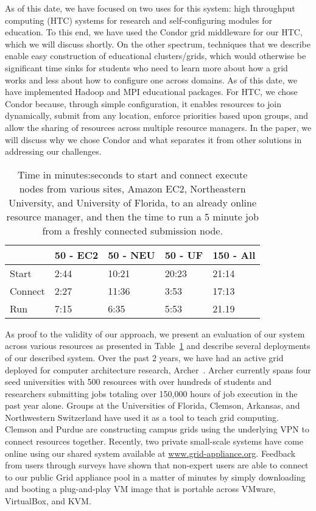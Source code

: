 \documentclass[workingdraft,endnotes]{usetex-v1}
\begin{document}
As of this date, we have focused on two uses for this system: high throughput
computing (HTC) systems for research and self-configuring modules for
education.  To this end, we have used the Condor grid middleware for our HTC,
which we will discuss shortly.  On the other spectrum, techniques that we
describe enable easy construction of educational clusters/grids, which would
otherwise be significant time sinks for students who need to learn more about
how a grid works and less about how to configure one across domains.  As of
this date, we have implemented Hadoop and MPI educational packages.  For HTC,
we chose Condor because, through simple configuration, it enables resources to
join dynamically, submit from any location, enforce priorities based upon
groups, and allow the sharing of resources across multiple resource managers.
In the paper, we will discuss why we chose Condor and what separates it from
other solutions in addressing our challenges.

\begin{table}[ht]
\small{
\setlength{\itemsep}{0pt}
\setlength{\parskip}{0pt}
\centering
\begin{tabular}[c]{|m{1.0cm}||m{1.2cm}|m{1.2cm}|m{1.2cm}|m{1.2cm}|} \hline
& 50 - EC2 & 50 - NEU & 50 - UF & 150 - All \\ \hline\hline
Start & 2:44 & 10:21 & 20:23 & 21:14 \\ \hline
Connect & 2:27 & 11:36 & 3:53 & 17:13\\ \hline
Run & 7:15 & 6:35 & 5:53 & 21.19 \\ \hline
\end{tabular}
\caption{\small{Time in minutes:seconds to start and connect execute nodes from
various sites, Amazon EC2, Northeastern University, and University of Florida,
to an already online resource manager, and then the time to run a 5 minute job
from a freshly connected submission node.}}
\label{tab:results}
}
\end{table}

As proof to the validity of our approach, we present an evaluation of our
system across various resources as presented in Table~\ref{tab:results} and
describe several deployments of our described system.  Over the past 2 years,
we have had an active grid deployed for computer architecture research,
Archer~\cite{archer}.  Archer currently spans four seed universities with 500
resources with over hundreds of students and researchers submitting jobs
totaling over 150,000 hours of job execution in the past year alone.  Groups at
the Universities of Florida, Clemson, Arkansas, and Northwestern Switzerland
have used it as a tool to teach grid computing.  Clemson and Purdue are
constructing campus grids using the underlying VPN to connect resources
together.  Recently, two private small-scale systems have come online using our
shared system available at \url{www.grid-appliance.org}. Feedback from users
through surveys have shown that non-expert users are able to connect to our
public Grid appliance pool in a matter of minutes by simply downloading and
booting a plug-and-play VM image that is portable across VMware, VirtualBox,
and KVM.
\end{document}
